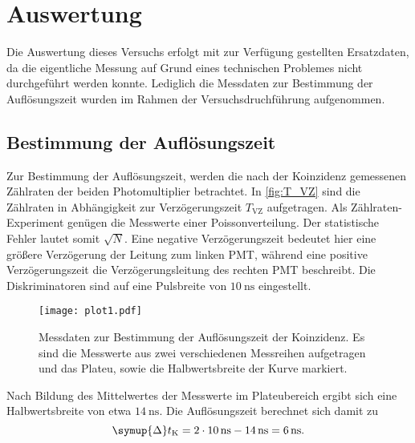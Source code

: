 \section{Auswertung}
\label{sec:Auswertung}
Die Auswertung dieses Versuchs erfolgt mit zur Verfügung gestellten Ersatzdaten, da die eigentliche Messung auf Grund eines technischen Problemes 
nicht durchgeführt werden konnte. Lediglich die Messdaten zur Bestimmung der Auflösungszeit wurden im Rahmen der Versuchsdruchführung aufgenommen.

\subsection{Bestimmung der Auflösungszeit}
Zur Bestimmung der Auflösungszeit, werden die nach der Koinzidenz gemessenen Zählraten der beiden Photomultiplier betrachtet. In \autoref{fig:T_VZ} sind 
die Zählraten in Abhängigkeit zur Verzögerungszeit $T_\text{VZ}$ aufgetragen. Als Zählraten-Experiment genügen die Messwerte einer Poissonverteilung. Der statistische 
Fehler lautet somit $\sqrt{N}$. 
Eine negative Verzögerungszeit bedeutet hier eine größere Verzögerung der 
Leitung zum linken PMT, während eine positive Verzögerungszeit die Verzögerungsleitung des rechten PMT beschreibt. Die Diskriminatoren sind auf eine Pulsbreite 
von $\qty{10}{\nano\second}$ eingestellt. 
\begin{figure}
  \centering
  \texttt{[image: plot1.pdf]}
  \caption{Messdaten zur Bestimmung der Auflösungszeit der Koinzidenz. Es sind die Messwerte aus zwei 
  verschiedenen Messreihen aufgetragen und das Plateu, sowie die Halbwertsbreite der Kurve markiert.}
  \label{fig:T_VZ}
\end{figure}
Nach Bildung des Mittelwertes der Messwerte im Plateubereich ergibt sich eine Halbwertsbreite von etwa $\qty{14}{\nano\second}$.
Die Auflösungszeit berechnet sich damit zu 
\begin{equation*}
  \symup{\Delta} t_\text{K} = 2 \cdot \qty{10}{\nano\second} - \qty{14}{\nano\second} = \qty{6}{\nano\second}.
\end{equation*}

